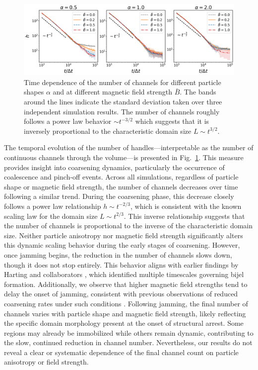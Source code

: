 \begin{figure}
\includegraphics[width=\textwidth]{../figures/results/paper1_5/handles_time.png}%
\caption{Time dependence of the number of channels for different particle shapes $\alpha$ and at different magnetic field strength $\bar{B}$. 
         The bands around the lines indicate the standard deviation taken over three independent simulation results. The number of channels roughly 
         follows a power law behavior $\sim t^{-3/2}$ which suggests that it is inversely proportional to the characteristic domain size $L \sim t^{3/2}$.
\label{fig:handles_time}}%
\end{figure}

The temporal evolution of the number of handles—interpretable as the number of continuous channels through the volume—is presented in Fig.~\ref{fig:handles_time}. This measure provides insight 
into coarsening dynamics, particularly the occurrence of coalescence and pinch-off events. Across all simulations, regardless of particle shape or magnetic field strength, the number of channels 
decreases over time following a similar trend. During the coarsening phase, this decrease closely follows a power law relationship \(h \sim t^{-2/3}\), which is consistent with the known scaling 
law for the domain size \(L \sim t^{2/3}\). This inverse relationship suggests that the number of channels is proportional to the inverse of the characteristic domain size. 
Neither particle anisotropy nor magnetic field strength significantly alters this dynamic scaling behavior during the early stages of coarsening. However, once jamming begins, the reduction in the 
number of channels slows down, though it does not stop entirely. This behavior aligns with earlier findings by Harting and collaborators \cite{gunther_timescales_2014}, which identified multiple 
timescales governing bijel formation. Additionally, we observe that higher magnetic field strengths tend to delay the onset of jamming, consistent with previous observations of reduced coarsening 
rates under such conditions \cite{karthikeyan_formation_2024}.
Following jamming, the final number of channels varies with particle shape and magnetic field strength, likely reflecting the specific domain morphology present at the onset of structural arrest. 
Some regions may already be immobilized while others remain dynamic, contributing to the slow, continued reduction in channel number. Nevertheless, our results do not reveal a clear or systematic 
dependence of the final channel count on particle anisotropy or field strength.

